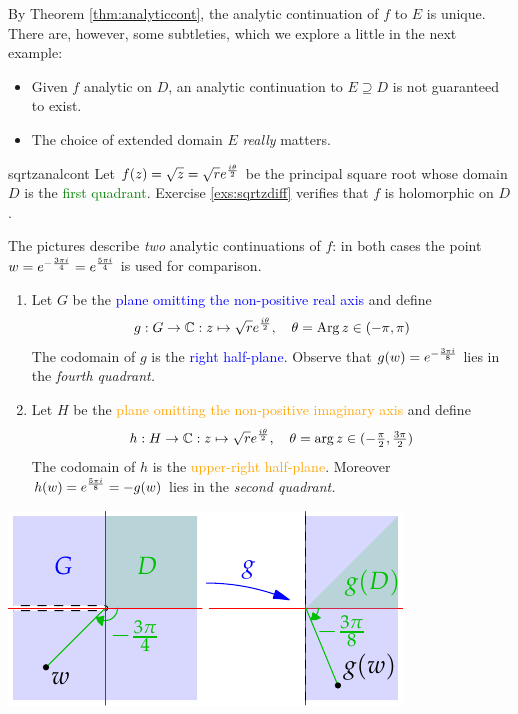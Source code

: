 By Theorem \ref{thm:analyticcont}, the analytic continuation of $f$ to $E$ is unique. There are, however, some subtleties, which we explore a little in the next example:
\begin{itemize}\itemsep2pt
  \item Given $f$ analytic on $D$, an analytic continuation to $E\supseteq D$ is not guaranteed to exist.
  \item The choice of extended domain $E$ \emph{really} matters.
\end{itemize}

\begin{example}{}{sqrtzanalcont}
	Let $f(z)=\sqrt z=\sqrt re^{\frac{i\theta}{2}}$ be the principal square root whose domain $D$ is the \textcolor{Green}{first quadrant}. Exercise \ref{exs:sqrtzdiff} verifies that $f$ is holomorphic on $D$.\par
	The pictures describe \emph{two} analytic continuations of $f$: in both cases the point $w=e^{-\frac{3\pi i}{4}}=e^{\frac{5\pi i}{4}}$ is used for comparison.\par
	\begin{minipage}[t]{0.61\linewidth}\vspace{-5pt}
		\begin{enumerate}
		  \item Let $G$ be the \textcolor{blue}{plane omitting the non-positive real axis} and define
			\[
				g:G\to\mathbb{C}:z\mapsto \sqrt re^{\frac{i\theta}{2}},\quad \theta=\operatorname{Arg} z\in(-\pi,\pi)
			\]
			The codomain of $g$ is the \textcolor{blue}{right half-plane}. Observe that $g(w)=e^{-\frac{3\pi i}{8}}$ lies in the \emph{fourth quadrant.}
			\item	Let $H$ be the \textcolor{orange}{plane omitting the non-positive imaginary axis} and define
			\[
				h:H\to\mathbb{C}:z\mapsto \sqrt re^{\frac{i\theta}{2}},\quad \theta=\arg z\in(-\tfrac\pi 2,\tfrac{3\pi}2)
			\]
			The codomain of $h$ is the \textcolor{orange}{upper-right half-plane}. Moreover $h(w)=e^{\frac{5\pi i}{8}}=-g(w)$ lies in the \emph{second quadrant.}
		\end{enumerate}
	\end{minipage}
	\hfill
	\begin{minipage}[t]{0.38\linewidth}\vspace{-15pt}
		\flushright\includegraphics[scale=0.95]{analytic-cont1}\\

\end{minipage}
\end{example}

